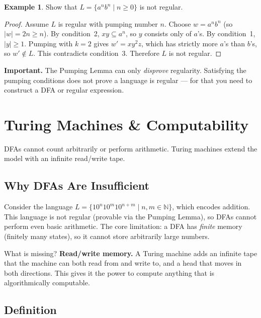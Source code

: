 \documentclass[11pt, a4paper]{article}
\theoremstyle{definition}
\newtheorem{example}{Example}[section]
\theoremstyle{remark}
\begin{document}
\begin{example}
Show that $L=\{a^nb^n\mid n\geq 0\}$ is not regular.

\begin{proof}
Assume $L$ is regular with pumping number $n$.  Choose $w=a^nb^n$ (so $|w|=2n\geq n$).
By condition~2, $xy\subseteq a^n$, so $y$ consists only of $a$'s.  By condition~1,
$|y|\geq 1$.  Pumping with $k=2$ gives $w'=xy^2z$, which has strictly more $a$'s than
$b$'s, so $w'\notin L$.  This contradicts condition~3.  Therefore $L$ is not regular.
\end{proof}
\end{example}

\begin{notebox}
\textbf{Important.}  The Pumping Lemma can only \emph{disprove} regularity.  Satisfying the
pumping conditions does not prove a language is regular --- for that you need to construct
a DFA or regular expression.
\end{notebox}

\section{Turing Machines \& Computability}

DFAs cannot count arbitrarily or perform arithmetic.  Turing machines extend the model with
an infinite read/write tape.

\subsection{Why DFAs Are Insufficient}

Consider the language $L=\{10^n10^m10^{n+m}\mid n,m\in\mathbb{N}\}$, which encodes
addition.  This language is not regular (provable via the Pumping Lemma), so DFAs cannot
perform even basic arithmetic.  The core limitation: a DFA has \emph{finite} memory (finitely
many states), so it cannot store arbitrarily large numbers.

What is missing?  \textbf{Read/write memory.}  A Turing machine adds an infinite tape that
the machine can both read from and write to, and a head that moves in both directions.  This
gives it the power to compute anything that is algorithmically computable.

\subsection{Definition}
\end{document}
